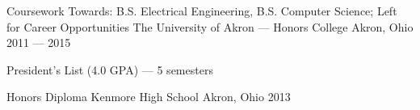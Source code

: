 \begin{cventries}
    \cventry
        {Coursework Towards: B.S. Electrical Engineering, B.S. Computer Science; Left for Career Opportunities}
        {The University of Akron --- Honors College}
        {Akron, Ohio}
        {2011 --- 2015}
        {
            \begin{cvitems}
                \item{President's List (4.0 GPA) --- 5 semesters}
            \end{cvitems}
        }
    \cventry
        {Honors Diploma}
        {Kenmore High School}
        {Akron, Ohio}
        {2013}
        {}

\end{cventries}
